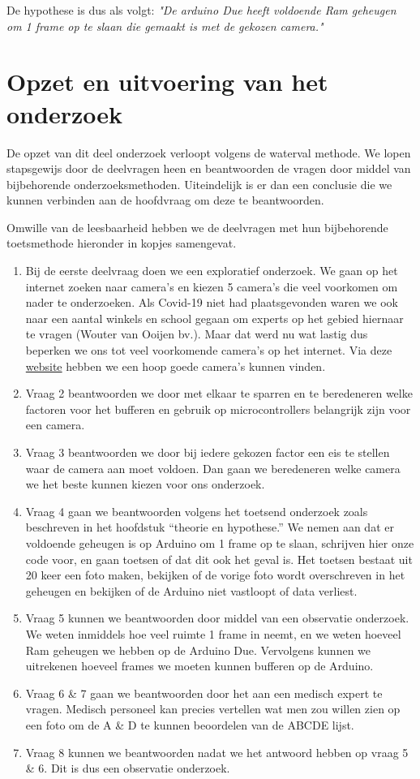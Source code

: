 \documentclass{article}
\begin{document}
De hypothese is dus als volgt: \textit{"De arduino Due heeft voldoende Ram geheugen om 1 frame op te slaan die gemaakt is met de gekozen camera."}

\section{Opzet en uitvoering van het onderzoek}
De opzet van dit deel onderzoek verloopt volgens de waterval methode. We lopen stapsgewijs door de deelvragen heen en beantwoorden de vragen door middel van bijbehorende onderzoeksmethoden. Uiteindelijk is er dan een conclusie die we kunnen verbinden aan de hoofdvraag om deze te beantwoorden.

Omwille van de leesbaarheid hebben we de deelvragen met hun bijbehorende toetsmethode hieronder in kopjes samengevat. 
\begin{enumerate}
	\item Bij de eerste deelvraag doen we een exploratief onderzoek. We gaan op het internet zoeken naar camera’s en kiezen 5 camera’s die veel voorkomen om nader te onderzoeken. Als Covid-19 niet had plaatsgevonden waren we ook naar een aantal winkels en school gegaan om experts op het gebied hiernaar te vragen (Wouter van Ooijen bv.). Maar dat werd nu wat lastig dus beperken we ons tot veel voorkomende camera’s op het internet. Via deze \href{https://www.open-electronics.org/a-complete-guide-to-arduino-based-video-camera/}{website} hebben we een hoop goede camera’s kunnen vinden.
	\item Vraag 2 beantwoorden we door met elkaar te sparren en te beredeneren welke factoren voor het bufferen en gebruik op microcontrollers belangrijk zijn voor een camera.
	\item Vraag 3 beantwoorden we door bij iedere gekozen factor een eis te stellen waar de camera aan moet voldoen. Dan gaan we beredeneren welke camera we het beste kunnen kiezen voor ons onderzoek.
	\item Vraag 4 gaan we beantwoorden volgens het toetsend onderzoek zoals beschreven in het hoofdstuk “theorie en hypothese.” We nemen aan dat er voldoende geheugen is op Arduino om 1 frame op te slaan, schrijven hier onze code voor, en gaan toetsen of dat dit ook het geval is. Het toetsen bestaat uit 20 keer een foto maken, bekijken of de vorige foto wordt overschreven in het geheugen en bekijken of de Arduino niet vastloopt of data verliest.
	\item Vraag 5 kunnen we beantwoorden door middel van een observatie onderzoek. We weten inmiddels hoe veel ruimte 1 frame in neemt, en we weten hoeveel Ram geheugen we hebben op de Arduino Due. Vervolgens kunnen we uitrekenen hoeveel frames we moeten kunnen bufferen op de Arduino.
	\item Vraag 6 {\&} 7 gaan we beantwoorden door het aan een medisch expert te vragen. Medisch personeel kan precies vertellen wat men zou willen zien op een foto om de A {\&} D te kunnen beoordelen van de ABCDE lijst.
	\item Vraag 8 kunnen we beantwoorden nadat we het antwoord hebben op vraag 5 {\&} 6. Dit is dus een observatie onderzoek.  

\end{enumerate} 
\end{document}
